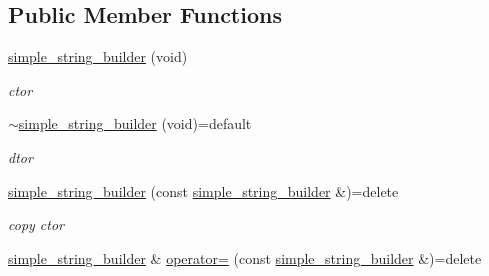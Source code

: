 \subsection*{Public Member Functions}
\begin{DoxyCompactItemize}
\item 
\mbox{\label{classcpp__redis_1_1builders_1_1simple__string__builder_a51fcb7777a78cbd3599aae8896e4d06a}} 
\mbox{\hyperlink{classcpp__redis_1_1builders_1_1simple__string__builder_a51fcb7777a78cbd3599aae8896e4d06a}{simple\+\_\+string\+\_\+builder}} (void)
\begin{DoxyCompactList}\small\item\em ctor \end{DoxyCompactList}\item 
\mbox{\label{classcpp__redis_1_1builders_1_1simple__string__builder_a7b4f012c532535801f9d5fddbb01d675}} 
\mbox{\hyperlink{classcpp__redis_1_1builders_1_1simple__string__builder_a7b4f012c532535801f9d5fddbb01d675}{$\sim$simple\+\_\+string\+\_\+builder}} (void)=default
\begin{DoxyCompactList}\small\item\em dtor \end{DoxyCompactList}\item 
\mbox{\label{classcpp__redis_1_1builders_1_1simple__string__builder_a0a17d659e654ee1190c635d3b3093235}} 
\mbox{\hyperlink{classcpp__redis_1_1builders_1_1simple__string__builder_a0a17d659e654ee1190c635d3b3093235}{simple\+\_\+string\+\_\+builder}} (const \mbox{\hyperlink{classcpp__redis_1_1builders_1_1simple__string__builder}{simple\+\_\+string\+\_\+builder}} \&)=delete
\begin{DoxyCompactList}\small\item\em copy ctor \end{DoxyCompactList}\item 
\mbox{\label{classcpp__redis_1_1builders_1_1simple__string__builder_afc86dd3148ef0094d08b4282f7cb597d}} 
\mbox{\hyperlink{classcpp__redis_1_1builders_1_1simple__string__builder}{simple\+\_\+string\+\_\+builder}} \& \mbox{\hyperlink{classcpp__redis_1_1builders_1_1simple__string__builder_afc86dd3148ef0094d08b4282f7cb597d}{operator=}} (const \mbox{\hyperlink{classcpp__redis_1_1builders_1_1simple__string__builder}{simple\+\_\+string\+\_\+builder}} \&)=delete

\end{DoxyCompactItemize}

